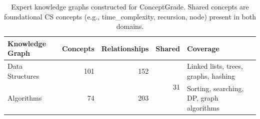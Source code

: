 \begin{table}[h]\centering
\caption{Expert knowledge graphs constructed for ConceptGrade. Shared concepts are foundational CS concepts (e.g., time\_complexity, recursion, node) present in both domains.}
\label{tab:kgstats}
\begin{tabular}{@{}lrrrl@{}}\toprule
\textbf{Knowledge Graph} & \textbf{Concepts} & \textbf{Relationships} & \textbf{Shared} & \textbf{Coverage} \\\midrule
Data Structures & 101 & 152 & \multirow{2}{*}{31} & Linked lists, trees, graphs, hashing \\
Algorithms & 74 & 203 & & Sorting, searching, DP, graph algorithms \\
\bottomrule\end{tabular}\end{table}